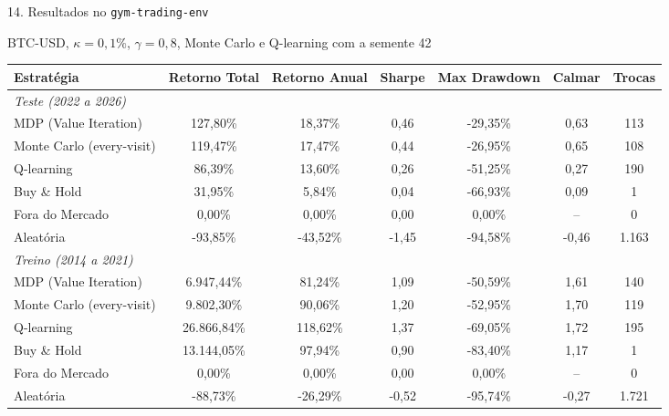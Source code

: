 \documentclass[aspectratio=169,10pt,t]{beamer}
\begin{document}
\begin{frame}{14. Resultados no \texttt{gym-trading-env}}

  \begin{block}{BTC-USD, $\kappa = 0{,}1\%$, $\gamma = 0{,}8$, Monte Carlo e Q-learning com a semente 42}
    \centering\scriptsize
    \setlength{\tabcolsep}{5pt}
    \renewcommand{\arraystretch}{1.05}
    \begin{tabular}{l cccccc}
      \toprule
      \textbf{Estratégia} & \textbf{Retorno Total} & \textbf{Retorno Anual} & \textbf{Sharpe} & \textbf{Max Drawdown} & \textbf{Calmar} & \textbf{Trocas} \\
      \midrule
      \multicolumn{7}{l}{\textit{Teste (2022 a 2026)}} \\
      MDP (Value Iteration)          & 127,80\%          & 18,37\%          & 0,46          & -29,35\%          & 0,63          & 113 \\
      Monte Carlo (every-visit)      & 119,47\%          & 17,47\%          & 0,44          & -26,95\%          & 0,65          & 108 \\
      Q-learning                     & 86,39\%           & 13,60\%          & 0,26          & -51,25\%          & 0,27          & 190 \\
      Buy \& Hold                    & 31,95\%           & 5,84\%           & 0,04          & -66,93\%          & 0,09          & 1 \\
      Fora do Mercado                & 0,00\%            & 0,00\%           & 0,00          & 0,00\%            & --            & 0 \\
      Aleatória                      & -93,85\%          & -43,52\%         & -1,45         & -94,58\%          & -0,46         & 1.163 \\
      \midrule
      \multicolumn{7}{l}{\textit{Treino (2014 a 2021)}} \\
      MDP (Value Iteration)          & 6.947,44\%        & 81,24\%          & 1,09          & -50,59\%          & 1,61          & 140 \\
      Monte Carlo (every-visit)      & 9.802,30\%        & 90,06\%          & 1,20          & -52,95\%          & 1,70          & 119 \\
      Q-learning                     & 26.866,84\%       & 118,62\%         & 1,37          & -69,05\%          & 1,72          & 195 \\
      Buy \& Hold                    & 13.144,05\%       & 97,94\%          & 0,90          & -83,40\%          & 1,17          & 1 \\
      Fora do Mercado                & 0,00\%            & 0,00\%           & 0,00          & 0,00\%            & --            & 0 \\
      Aleatória                      & -88,73\%          & -26,29\%         & -0,52         & -95,74\%          & -0,27         & 1.721 \\
      \bottomrule
    \end{tabular}
  \end{block}


\end{frame}
\end{document}
